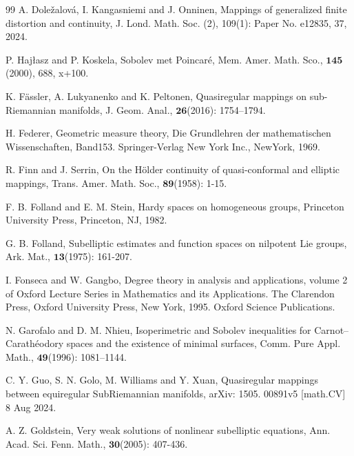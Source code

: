 \documentclass[11pt,twoside]{article}
\theoremstyle{definition}
\theoremstyle{remark}
\begin{document}
\begin{thebibliography}{99}
A. Dole\v{z}alov\'{a}, I. Kangasniemi and  J. Onninen, Mappings of generalized finite distortion and continuity, J. Lond. Math. Soc. (2), 109(1): Paper No. e12835, 37, 2024.



P. Hajłasz and P. Koskela, Sobolev met Poincar\'{e}, Mem. Amer. Math. Sco.,  $\mathbf{145}$(2000), 688, x+100.


K. F\"{a}ssler, A. Lukyanenko and K. Peltonen, Quasiregular mappings on sub-Riemannian manifolds, J. Geom. Anal., $\mathbf{26}$(2016): 1754–1794. 



 H. Federer, Geometric measure theory, Die Grundlehren der mathematischen Wissenschaften, Band153. Springer-Verlag New York Inc., NewYork, 1969.




R. Finn and J. Serrin,  On the H\"{o}lder continuity of quasi-conformal and elliptic mappings, Trans. Amer. Math. Soc., $\mathbf{89}$(1958): 1-15.




F. B. Folland and E. M. Stein, Hardy spaces on homogeneous groups, Princeton University Press, Princeton, NJ,  1982.



G. B. Folland,  Subelliptic estimates and function spaces on nilpotent Lie groups, Ark. Mat., $\mathbf{13}$(1975): 161-207. 

I. Fonseca and W. Gangbo, Degree theory in analysis and applications, volume 2 of Oxford Lecture Series in Mathematics and its Applications. The Clarendon Press,
 Oxford University Press, New York, 1995. Oxford Science Publications.








N. Garofalo and D. M. Nhieu, Isoperimetric and Sobolev inequalities for Carnot–Carath\'{e}odory spaces and the existence of minimal surfaces, Comm. Pure Appl. Math., $\mathbf{49}$(1996): 1081–1144.

C. Y. Guo, S. N. Golo, M. Williams and Y. Xuan,  Quasiregular mappings between equiregular SubRiemannian manifolds, arXiv: 1505. 00891v5 [math.CV] 8 Aug 2024.


A. Z. Goldstein, Very weak solutions of nonlinear subelliptic equations, Ann. Acad. Sci. Fenn. Math., $\mathbf{30}$(2005): 407-436.







\end{thebibliography}
\end{document}
